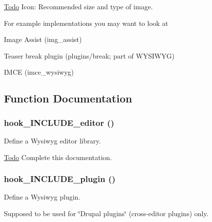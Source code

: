 \begin{Desc}
\item[\hyperlink{todo__todo000091}{Todo}]Icon: Recommended size and type of image.\end{Desc}
For example implementations you may want to look at
\begin{DoxyItemize}
\item Image Assist (img\_\-assist)
\item Teaser break plugin (plugins/break; part of WYSIWYG)
\item IMCE (imce\_\-wysiwyg) 
\end{DoxyItemize}

\subsection{Function Documentation}
\hypertarget{wysiwyg_8api_8php_ad3605f8cb948779e59e72c711a7ff843}{
\subsubsection[{hook\_\-INCLUDE\_\-editor}]{\setlength{\rightskip}{0pt plus 5cm}hook\_\-INCLUDE\_\-editor ()}}
\label{wysiwyg_8api_8php_ad3605f8cb948779e59e72c711a7ff843}
Define a Wysiwyg editor library.

\begin{Desc}
\item[\hyperlink{todo__todo000092}{Todo}]Complete this documentation. \end{Desc}
\hypertarget{wysiwyg_8api_8php_a20be879b59430637a6832dbbc221eb7c}{
\subsubsection[{hook\_\-INCLUDE\_\-plugin}]{\setlength{\rightskip}{0pt plus 5cm}hook\_\-INCLUDE\_\-plugin ()}}
\label{wysiwyg_8api_8php_a20be879b59430637a6832dbbc221eb7c}
Define a Wysiwyg plugin.

Supposed to be used for \char`\"{}Drupal plugins\char`\"{} (cross-\/editor plugins) only.

